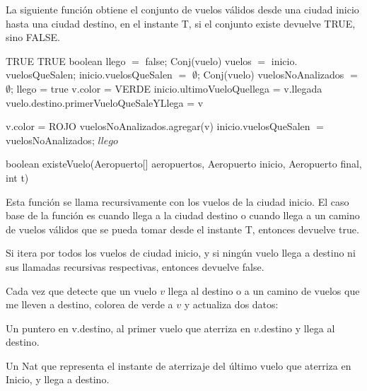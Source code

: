 \newpage
La siguiente funci\'on obtiene el conjunto de vuelos v\'alidos desde una ciudad inicio hasta una ciudad destino, en el instante T, si el conjunto existe devuelve TRUE, sino FALSE.

\begin{algorithm}[H]
\begin{algorithmic}[1]
		\RETURN TRUE
\ENDIF
{}	
		\RETURN TRUE
\ENDIF
\STATE boolean llego $=$ false;
\STATE Conj(vuelo) vuelos $=$ inicio$.$vuelosQueSalen;
\STATE inicio$.$vuelosQueSalen $=$ $\emptyset$;
\STATE Conj(vuelo) vuelosNoAnalizados $=$ $\emptyset$;
				\STATE llego = true
				\STATE v.color = VERDE
					\STATE inicio.ultimoVueloQuellega = v.llegada
				\ENDIF
					\STATE vuelo.destino.primerVueloQueSaleYLlega = v
				\ENDIF

			\ELSE
				\STATE v.color = ROJO								
	    		\ENDIF    			
		\ENDIF
	\ELSE
		\STATE vuelosNoAnalizados.agregar(v)										    
    \ENDIF
\ENDFOR
\STATE inicio$.$vuelosQueSalen $=$ vuelosNoAnalizados;
\RETURN $llego$
\caption{boolean existeVuelo(Aeropuerto[] aeropuertos, Aeropuerto inicio, Aeropuerto final, int t)}%
\end{algorithmic}
\end{algorithm}

Esta funci\'on se llama recursivamente con los vuelos de la ciudad inicio. El caso base de la funci\'on es cuando llega a la ciudad destino o cuando llega a un camino de vuelos v\'alidos que se pueda tomar desde el instante T, entonces devuelve true.

Si itera por todos los vuelos de ciudad inicio, y si ning\'un vuelo llega a destino ni sus llamadas recursivas respectivas, entonces devuelve false.

Cada vez que detecte que un vuelo $v$ llega al destino o a un camino de vuelos que me lleven a destino, colorea de verde a $v$ y actualiza dos datos:

Un puntero en v.destino, al primer vuelo que aterriza en $v$.destino y llega al destino.

Un Nat que representa el instante de aterrizaje del \'ultimo vuelo que aterriza en Inicio, y llega a destino.

